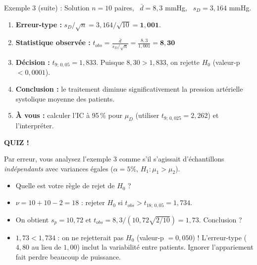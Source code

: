 \documentclass{BeamerTemplate}
\begin{document}
\begin{frame}[t]{Exemple 3 (suite) : Solution}
  $n = 10$ paires, \ $\bar{d} = 8{,}3$ mmHg, \ $s_D = 3{,}164$ mmHg.

  \medskip
  \begin{enumerate}\itemsep 3mm
    \item \textbf{Erreur-type :} $s_D / \sqrt{n} = 3{,}164 / \sqrt{10} = \mathbf{1{,}001}$.
    \item \textbf{Statistique observée :}
      $\displaystyle t_{obs} = \frac{\bar{d}}{s_D/\sqrt{n}} = \frac{8{,}3}{1{,}001} = \mathbf{8{,}30}$
    \item<2-> \textbf{Décision :} $t_{9;\,0{,}05} = 1{,}833$. Puisque $8{,}30 > 1{,}833$, on \alert{rejette $H_0$} (valeur-p $< 0{,}0001$).
    \item<2-> \textbf{Conclusion :} le traitement diminue significativement la pression artérielle systolique moyenne des patients.
    \item<2-> \textbf{À vous :} calculer l'IC à 95\,\% pour $\mu_D$ (utiliser $t_{9;\,0{,}025} = 2{,}262$) et l'interpréter.
  \end{enumerate}

  \medskip
\end{frame}

\begin{frame}[plain,t]
  \centerline{\LARGE\bfseries\alert{QUIZ !}}

  \medskip
  Par erreur, vous analysez l'exemple 3 comme s'il s'agissait d'échantillons \emph{indépendants} avec variances égales ($\alpha = 5\%$, $H_1: \mu_1 > \mu_2$).
  \begin{itemize}\itemsep 0.6cm
    \item Quelle est votre règle de rejet de $H_0$ ?
    \item<2-> $\nu = 10 + 10 - 2 = 18$ : rejeter $H_0$ si $t_{obs} > t_{18;\,0{,}05} = 1{,}734$.
    \item On obtient $s_p = 10{,}72$ et $t_{obs} = 8{,}3 / (10{,}72\sqrt{2/10}) = 1{,}73$. Conclusion ?
    \item<2-> $1{,}73 < 1{,}734$ : on \alert{ne rejetterait pas} $H_0$ (valeur-p $= 0{,}050$) ! L'erreur-type ($4{,}80$ au lieu de $1{,}00$) inclut la variabilité entre patients. \alert{Ignorer l'appariement fait perdre beaucoup de puissance.}
  \end{itemize}
\end{frame}
\end{document}
